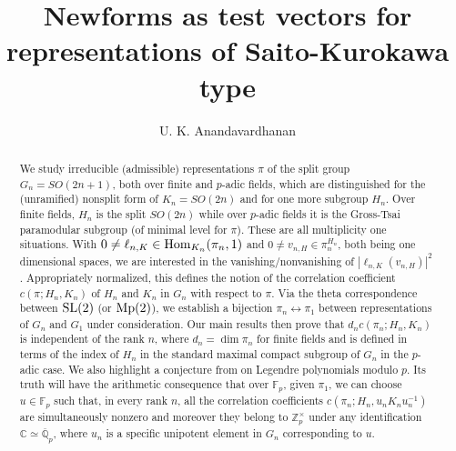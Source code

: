 \documentclass[12pt]{amsart}
\theoremstyle{definition}
\theoremstyle{remark}
\begin{document}
\title[Newforms as test vectors for representations of Saito-Kurokawa type]{Newforms as test vectors for representations of Saito-Kurokawa type}

\author{U. K. Anandavardhanan}

\address{Department of Mathematics, Indian Institute of Technology Bombay, Mumbai - 400076, India.} 


\date{}

\begin{abstract}
We study irreducible (admissible) representations $\pi$ of the split group $G_n=SO(2n+1)$, both over finite and $p$-adic fields, which are distinguished for the (unramified) nonsplit form of $K_n=SO(2n)$ and for one more subgroup $H_n$. Over finite fields, $H_n$ is the split $SO(2n)$ while over $p$-adic fields it is the Gross-Tsai paramodular subgroup (of minimal level for $\pi$). These are all multiplicity one situations. With $0 \neq \ell_{n,K} \in {\rm Hom}_{K_n}(\pi_n,1)$ and $0 \neq v_{n,H} \in \pi_n^{H_n}$, both being one dimensional spaces, we are interested in the vanishing/nonvanishing of $|\ell_{n,K}(v_{n,H})|^2$. Appropriately normalized, this defines the notion of the correlation coefficient $c(\pi;H_n,K_n)$ of $H_n$ and $K_n$ in $G_n$ with respect to $\pi$. Via the theta correspondence between ${\rm SL}(2)$ (or ${\rm Mp}(2)$), we establish a bijection $\pi_n \leftrightarrow \pi_1$ between representations of $G_n$ and $G_1$ under consideration. Our main results then prove that $d_n c(\pi_n;H_n,K_n)$ is independent of the rank $n$, where $d_n =\dim \pi_n$ for finite fields and is defined in terms of the index of $H_n$ in the standard maximal compact subgroup of $G_n$ in the $p$-adic case. We also highlight a conjecture from \cite{ana25} on Legendre polynomials modulo $p$. Its truth will have the arithmetic consequence that over $\mathbb F_p$, given $\pi_1$, we can choose $u \in \mathbb F_p$ such that, in every rank $n$, all the correlation coefficients $c(\pi_n;H_n,u_nK_n u_n^{-1})$ are simultaneously nonzero and moreover they belong to $\mathbb Z_p^\times$ under any identification $\mathbb C \simeq \overline{\mathbb Q}_p$, where $u_n$ is a specific unipotent element in $G_n$ corresponding to $u$.
\end{abstract}

\maketitle
\end{document}
